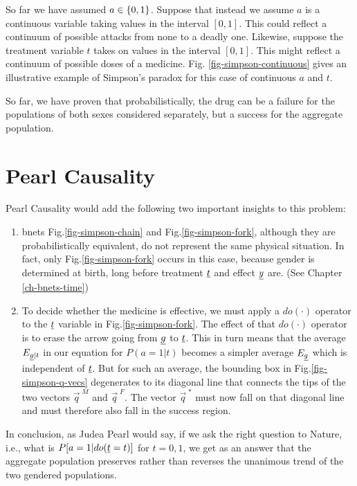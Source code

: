 So far
we have assumed 
$a\in\{0,1\}$.
Suppose that instead
we assume $a$ is a continuous variable
taking values in the interval $[0,1]$.
This could reflect a continuum of possible 
attacks from none to a deadly one.
Likewise, suppose the treatment variable
$t$ takes on values
in the interval $[0,1]$. This might
reflect a continuum of possible
doses of a medicine.
Fig. \ref{fig-simpson-continuous}
  gives an illustrative
  example 
  of Simpson's paradox
  for this case 
  of continuous $a$ and $t$.


So far, we have proven that probabilistically, 
the drug can be a failure for the populations
 of both sexes considered separately, 
but a success for the aggregate population.

\section{Pearl Causality}

Pearl Causality would add 
the following two 
important insights 
to this problem:
\begin{enumerate}
\item bnets Fig.\ref{fig-simpson-chain} 
and Fig.\ref{fig-simpson-fork}, 
although they are
probabilistically equivalent, 
do not represent the same physical
 situation. In fact, only
 Fig.\ref{fig-simpson-fork} 
occurs in this case, because gender is
determined at birth, long before treatment $\rvt$
 and effect $\rvy$ are. (See Chapter \ref{ch-bnets-time})
\item To decide whether the
 medicine is effective, we 
must apply a $do(\cdot)$ operator to
 the $\rvt$ variable in
 Fig.\ref{fig-simpson-fork}. 
The effect of that $do(\cdot)$ operator
 is to erase the arrow going 
from $ \rvg$ to $ \rvt$. This in turn means
 that the average $ E_{\ul{g}|t}$
 in our equation for $ P(a=1|t)$
 becomes a simpler average $ E_{\ul{g}}$
 which is independent of $ \rvt$. 
But for such an average,
 the
 bounding box in Fig.\ref{fig-simpson-q-vecs}
 degenerates to its diagonal 
line that connects the tips
 of the two vectors $ \vec{q}^{\;M}$
 and $ \vec{q}^{\;F}$. The vector 
$ \vec{q}^{\;*}$ must now fall on 
that diagonal line and must therefore
 also fall in the success region.
\end{enumerate}
In conclusion, as Judea Pearl would say,
 if we ask the right question to Nature,
 i.e., what is
 $ P[a=1 | do(\ul{t}=t)]$ for $ t=0,1$,
 we get as an answer that the 
aggregate population preserves 
rather than reverses the
 unanimous trend of the 
two gendered populations.
\newpage
